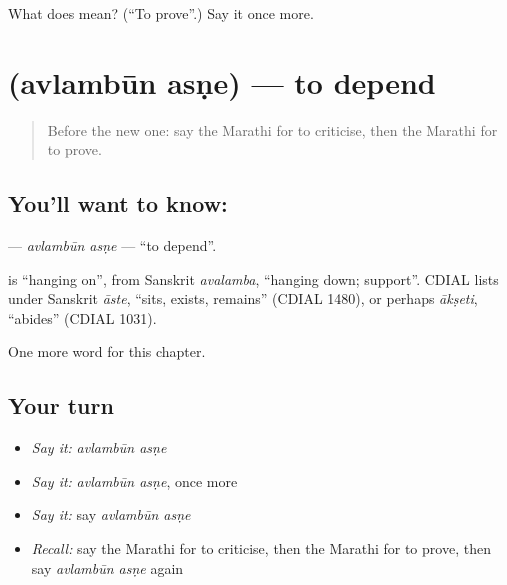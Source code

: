 \begin{tcolorbox}[breakable,colback=teal!4,colframe=teal!35!black,title={Before you move on}]
What does   mean? (\textquotedblleft{}To prove\textquotedblright{}.) Say it once more.
\end{tcolorbox}
\section[\texorpdfstring{\mr{अवलंबून} \mr{असणे} (avlambūn asṇe)}{अवलंबून असणे (avlambūn asṇe)}]{  (avlambūn asṇe) — to depend}

\label{lesson:MR-C225-avlambun-asne}



\begin{quote}
Before the new one: say the Marathi for to criticise, then the Marathi for to prove.
\end{quote}

\subsection*{You'll want to know:  }
\textbf{ } — \emph{avlambūn asṇe} — \textquotedblleft{}to depend\textquotedblright{}.

\begin{cousinweb}
\textbf{} is \textquotedblleft{}hanging on\textquotedblright{}, from Sanskrit \emph{avalamba}, \textquotedblleft{}hanging down; support\textquotedblright{}. CDIAL lists \textbf{} under Sanskrit \emph{āste}, \textquotedblleft{}sits, exists, remains\textquotedblright{} (CDIAL 1480), or perhaps \emph{ākṣeti}, \textquotedblleft{}abides\textquotedblright{} (CDIAL 1031).
\end{cousinweb}

\begin{grammarlens}[title={What you've built}]
One more word for this chapter.
\end{grammarlens}

\subsection*{Your turn}
\begin{itemize}
\raggedright
  \item \emph{Say it:} \emph{avlambūn asṇe}
  \item \emph{Say it:} \emph{avlambūn asṇe}, once more
  \item \emph{Say it:} say \emph{avlambūn asṇe}
  \item \emph{Recall:} say the Marathi for to criticise, then the Marathi for to prove, then say \emph{avlambūn asṇe} again
\end{itemize}

